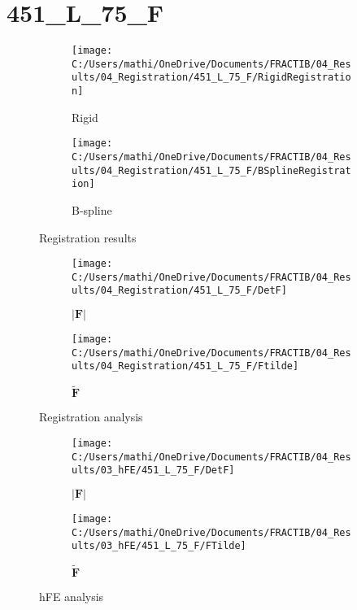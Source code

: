 \documentclass{article}%
\begin{document}
%
\newpage%
\section*{451\_L\_75\_F}%
\label{sec:451L75F}%


\begin{figure}[h!]%
\begin{subfigure}[b]{0.5\linewidth}%
\texttt{[image: C:/Users/mathi/OneDrive/Documents/FRACTIB/04\_Results/04\_Registration/451\_L\_75\_F/RigidRegistration]}%
\caption{Rigid}%
\end{subfigure}%
\begin{subfigure}[b]{0.5\linewidth}%
\texttt{[image: C:/Users/mathi/OneDrive/Documents/FRACTIB/04\_Results/04\_Registration/451\_L\_75\_F/BSplineRegistration]}%
\caption{B{-}spline}%
\end{subfigure}%
\caption{Registration results}%
\end{figure}

%


\begin{figure}[h!]%
\begin{subfigure}[b]{0.5\linewidth}%
\texttt{[image: C:/Users/mathi/OneDrive/Documents/FRACTIB/04\_Results/04\_Registration/451\_L\_75\_F/DetF]}%
\caption{$|\mathbf{F}|$}%
\end{subfigure}%
\begin{subfigure}[b]{0.5\linewidth}%
\texttt{[image: C:/Users/mathi/OneDrive/Documents/FRACTIB/04\_Results/04\_Registration/451\_L\_75\_F/Ftilde]}%
\caption{$\tilde{\mathbf{F}}$}%
\end{subfigure}%
\caption{Registration analysis}%
\end{figure}

%


\begin{figure}[h!]%
\begin{subfigure}[b]{0.5\linewidth}%
\texttt{[image: C:/Users/mathi/OneDrive/Documents/FRACTIB/04\_Results/03\_hFE/451\_L\_75\_F/DetF]}%
\caption{$|\mathbf{F}|$}%
\end{subfigure}%
\begin{subfigure}[b]{0.5\linewidth}%
\texttt{[image: C:/Users/mathi/OneDrive/Documents/FRACTIB/04\_Results/03\_hFE/451\_L\_75\_F/FTilde]}%
\caption{$\tilde{\mathbf{F}}$}%
\end{subfigure}%
\caption{hFE analysis}%
\end{figure}
\end{document}
